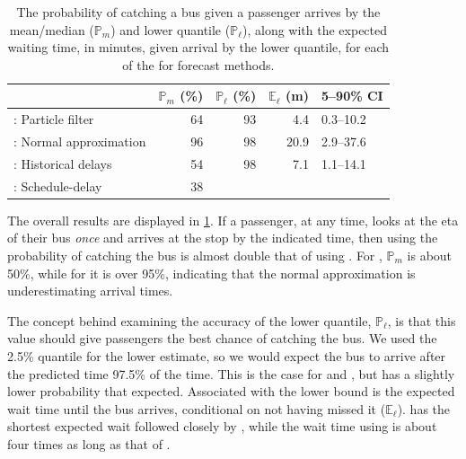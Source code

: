 \begin{knitrout}\small
{}\color{fgcolor}\begin{table}

\caption{\label{tab:model_results_pr_miss}The probability of catching a bus given a passenger arrives by the mean/median ($\mathbb{P}_m$) and lower quantile ($\mathbb{P}_\ell$), along with the expected waiting time, in minutes, given arrival by the lower quantile, for each of the for forecast methods.}
\centering
\fontsize{8}{10}\selectfont
\begin{tabular}[t]{lrrrl}
\toprule
  & $\mathbb{P}_m$ (\%) & $\mathbb{P}_\ell$ (\%) & $\mathbb{E}_\ell$ (m) & 5--90\% CI\\
\midrule
\Fpf{}: Particle filter & 64 & 93 & 4.4 & 0.3--10.2\\
\Fnorm{}: Normal approximation & 96 & 98 & 20.9 & 2.9--37.6\\
\Fhist{}: Historical delays & 54 & 98 & 7.1 & 1.1--14.1\\
\Fsched{}: Schedule-delay & 38 &  &  & \\
\bottomrule
\end{tabular}
\end{table}


\end{knitrout}

The overall results are displayed in \cref{tab:model_results_pr_miss}. If a passenger, at any time, looks at the \gls{eta} of their bus \emph{once} and arrives at the stop by the indicated time, then using \Fpf{} the probability of catching the bus is almost double that of using \Fsched{}. For \Fhist{}, $\mathbb{P}_m$ is about 50\%, while for \Fnorm{} it is over 95\%, indicating that the normal approximation is underestimating arrival times.


The concept behind examining the accuracy of the lower quantile, $\mathbb{P}_\ell$, is that this value should give passengers the best chance of catching the bus. We used the 2.5\% quantile for the lower estimate, so we would expect the bus to arrive after the predicted time 97.5\% of the time. This is the case for \Fnorm{} and \Fhist{}, but \Fpf{} has a slightly lower probability that expected. Associated with the lower bound is the expected wait time until the bus arrives, conditional on not having missed it ($\mathbb{E}_\ell$). \Fpf{} has the shortest expected wait followed closely by \Fhist{}, while the wait time using \Fnorm{} is about four times as long as that of \Fpf{}.


